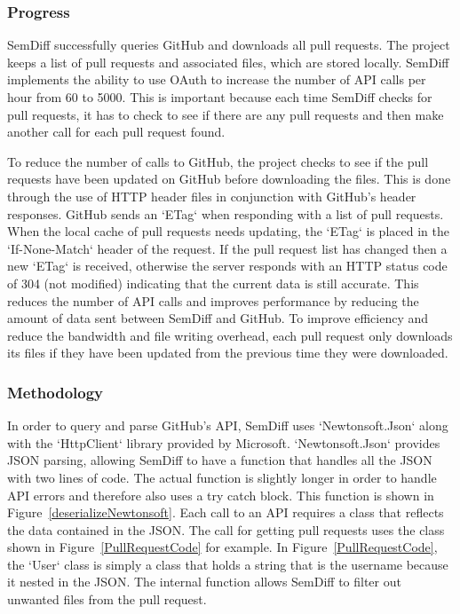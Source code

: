 \documentclass[draftclsnofoot,onecolumn]{IEEEtran}
\begin{document}
\subsubsection{Progress}

SemDiff successfully queries GitHub and downloads all pull requests. The 
project keeps a list of pull requests and associated files, which are stored 
locally. SemDiff implements the ability to use OAuth to increase the number of 
API calls per hour from 60 to 5000. This is important because each time SemDiff 
checks for pull requests, it has to check to see if there are any pull requests 
and then make another call for each pull request found.

To reduce the number of calls to GitHub, the project checks to see if the pull 
requests have been updated on GitHub before downloading the files. This is done 
through the use of HTTP header files in conjunction with GitHub’s header 
responses. GitHub sends an `ETag` when responding with a list of pull requests. 
When the local cache of pull requests needs updating, the `ETag` is placed in 
the `If-None-Match` header of the request. If the pull request list has changed 
then a new `ETag` is received, otherwise the server responds with an HTTP 
status code of 304 (not modified) indicating that the current data is still 
accurate. This reduces the number of API calls and improves performance by 
reducing the amount of data sent between SemDiff and GitHub. To improve 
efficiency and reduce the bandwidth and file writing overhead, each pull 
request only downloads its files if they have been updated from the previous 
time they were downloaded.

\subsubsection{Methodology}

In order to query and parse GitHub’s API, SemDiff uses `Newtonsoft.Json` along 
with the `HttpClient` library provided by Microsoft. `Newtonsoft.Json` provides 
JSON parsing, allowing SemDiff to have a function that handles all the JSON 
with two lines of code. The actual function is slightly longer in order to 
handle API errors and therefore also uses a try catch block. This function is 
shown in Figure~\ref{deserializeNewtonsoft}. Each call to an API requires a 
class that reflects the data contained in the JSON. The call for getting pull 
requests uses the class shown in Figure~\ref{PullRequestCode} for example. In 
Figure~\ref{PullRequestCode}, the `User` class is simply a class that holds a 
string that is the username because it nested in the JSON. The internal 
function allows SemDiff to filter out unwanted files from the pull request.
\end{document}
